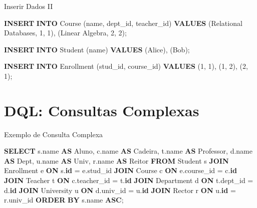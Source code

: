 \documentclass[
  ignorenonframetext,
]{beamer}
\newenvironment{Shaded}{}{}
\newcommand{\DecValTok}[1]{\textcolor[rgb]{0.25,0.63,0.44}{#1}}
\newcommand{\KeywordTok}[1]{\textcolor[rgb]{0.00,0.44,0.13}{\textbf{#1}}}
\newcommand{\NormalTok}[1]{#1}
\newcommand{\OperatorTok}[1]{\textcolor[rgb]{0.40,0.40,0.40}{#1}}
\newcommand{\StringTok}[1]{\textcolor[rgb]{0.25,0.44,0.63}{#1}}
\begin{document}
\begin{frame}[fragile]{Inserir Dados II}
\protect{}\label{inserir-dados-ii}
\begin{Shaded}
\begin{Highlighting}[]
\KeywordTok{INSERT} \KeywordTok{INTO}\NormalTok{ Course (name, dept\_id, teacher\_id) }
\KeywordTok{VALUES}\NormalTok{ (}\StringTok{\textquotesingle{}Relational Databases\textquotesingle{}}\NormalTok{, }\DecValTok{1}\NormalTok{, }\DecValTok{1}\NormalTok{), (}\StringTok{\textquotesingle{}Linear Algebra\textquotesingle{}}\NormalTok{, }\DecValTok{2}\NormalTok{, }\DecValTok{2}\NormalTok{);}

\KeywordTok{INSERT} \KeywordTok{INTO}\NormalTok{ Student (name) }\KeywordTok{VALUES}\NormalTok{ (}\StringTok{\textquotesingle{}Alice\textquotesingle{}}\NormalTok{), (}\StringTok{\textquotesingle{}Bob\textquotesingle{}}\NormalTok{);}

\KeywordTok{INSERT} \KeywordTok{INTO}\NormalTok{ Enrollment (stud\_id, course\_id) }
\KeywordTok{VALUES}\NormalTok{ (}\DecValTok{1}\NormalTok{, }\DecValTok{1}\NormalTok{), (}\DecValTok{1}\NormalTok{, }\DecValTok{2}\NormalTok{), (}\DecValTok{2}\NormalTok{, }\DecValTok{1}\NormalTok{);}
\end{Highlighting}
\end{Shaded}
\end{frame}

\section{DQL: Consultas Complexas}\label{dql-consultas-complexas}

\begin{frame}[fragile]{Exemplo de Consulta Complexa}
\protect{}\label{exemplo-de-consulta-complexa}
\begin{Shaded}
\begin{Highlighting}[]
\KeywordTok{SELECT}\NormalTok{ s.name }\KeywordTok{AS}\NormalTok{ Aluno, c.name }\KeywordTok{AS}\NormalTok{ Cadeira, t.name }\KeywordTok{AS}\NormalTok{ Professor, }
\NormalTok{       d.name }\KeywordTok{AS}\NormalTok{ Dept, u.name }\KeywordTok{AS}\NormalTok{ Univ, r.name }\KeywordTok{AS}\NormalTok{ Reitor}
\KeywordTok{FROM}\NormalTok{ Student s}
\KeywordTok{JOIN}\NormalTok{ Enrollment e }\KeywordTok{ON}\NormalTok{ s.}\KeywordTok{id} \OperatorTok{=}\NormalTok{ e.stud\_id}
\KeywordTok{JOIN}\NormalTok{ Course c }\KeywordTok{ON}\NormalTok{ e.course\_id }\OperatorTok{=}\NormalTok{ c.}\KeywordTok{id}
\KeywordTok{JOIN}\NormalTok{ Teacher t }\KeywordTok{ON}\NormalTok{ c.teacher\_id }\OperatorTok{=}\NormalTok{ t.}\KeywordTok{id}
\KeywordTok{JOIN}\NormalTok{ Department d }\KeywordTok{ON}\NormalTok{ t.dept\_id }\OperatorTok{=}\NormalTok{ d.}\KeywordTok{id}
\KeywordTok{JOIN}\NormalTok{ University u }\KeywordTok{ON}\NormalTok{ d.univ\_id }\OperatorTok{=}\NormalTok{ u.}\KeywordTok{id}
\KeywordTok{JOIN}\NormalTok{ Rector r }\KeywordTok{ON}\NormalTok{ u.}\KeywordTok{id} \OperatorTok{=}\NormalTok{ r.univ\_id}
\KeywordTok{ORDER} \KeywordTok{BY}\NormalTok{ s.name }\KeywordTok{ASC}\NormalTok{;}
\end{Highlighting}
\end{Shaded}
\end{frame}
\end{document}

